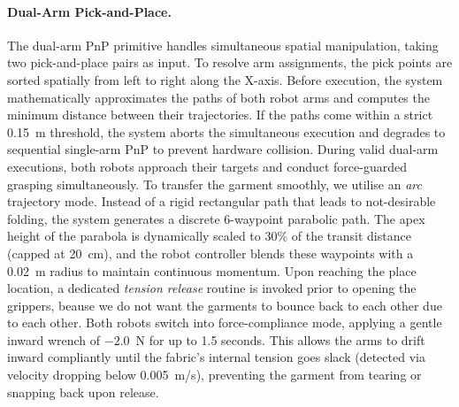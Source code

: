 \documentclass[journal]{IEEEtran}
\begin{document}
\paragraph{Dual-Arm Pick-and-Place.} The dual-arm PnP primitive handles simultaneous spatial manipulation, taking two pick-and-place pairs as input. To resolve arm assignments, the pick points are sorted spatially from left to right along the X-axis. Before execution, the system mathematically approximates the paths of both robot arms and computes the minimum distance between their trajectories. If the paths come within a strict 0.15~m threshold, the system aborts the simultaneous execution and degrades to sequential single-arm PnP to prevent hardware collision. During valid dual-arm executions, both robots approach their targets and conduct force-guarded grasping simultaneously. To transfer the garment smoothly, we utilise an \textit{arc} trajectory mode. Instead of a rigid rectangular path that leads to not-desirable folding, the system generates a discrete 6-waypoint parabolic path. The apex height of the parabola is dynamically scaled to 30\% of the transit distance (capped at 20~cm), and the robot controller blends these waypoints with a 0.02~m radius to maintain continuous momentum. Upon reaching the place location, a dedicated \textit{tension release} routine is invoked prior to opening the grippers, beause we do not want the garments to bounce back to each other due to each other. Both robots switch into force-compliance mode, applying a gentle inward wrench of $-2.0$~N for up to 1.5 seconds. This allows the arms to drift inward compliantly until the fabric's internal tension goes slack (detected via velocity dropping below 0.005~m/s), preventing the garment from tearing or snapping back upon release.
\end{document}
